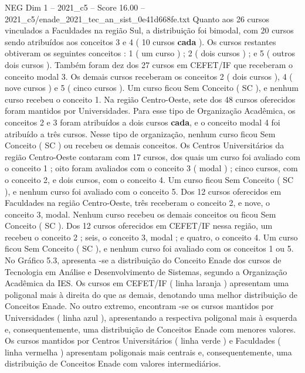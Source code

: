 \begin{textsample}{NEG Dim 1 – 2021\_c5 – Score 16.00 – 2021\_c5/enade\_2021\_tec\_an\_sist\_0e41d668fe.txt}
Quanto aos 26 cursos vinculados a Faculdades na região Sul, a distribuição foi bimodal, com 20 cursos sendo atribuídos aos conceitos 3 e 4 ( 10 cursos \textbf{cada} ).
Os cursos restantes obtiveram os seguintes conceitos : 1 ( um curso ) ; 2 ( dois cursos ) ; e 5 ( outros dois cursos ).
Também foram dez dos 27 cursos em CEFET/IF que receberam o conceito modal 3.
Os demais cursos receberam os conceitos 2 ( dois cursos ), 4 ( nove cursos ) e 5 ( cinco cursos ).
Um curso ficou Sem Conceito ( SC ), e nenhum curso recebeu o conceito 1.
Na região Centro-Oeste, sete dos 48 cursos oferecidos foram mantidos por Universidades.
Para esse tipo de Organização Acadêmica, os conceitos 2 e 3 foram atribuídos a dois cursos \textbf{cada}, e o conceito modal 4 foi atribuído a três cursos.
Nesse tipo de organização, nenhum curso ficou Sem Conceito ( SC ) ou recebeu os demais conceitos.
Os Centros Universitários da região Centro-Oeste contaram com 17 cursos, dos quais um curso foi avaliado com o conceito 1 ; oito foram avaliados com o conceito 3 ( modal ) ; cinco cursos, com o conceito 2, e dois cursos, com o conceito 4.
Um curso ficou Sem Conceito ( SC ), e nenhum curso foi avaliado com o conceito 5.
Dos 12 cursos oferecidos em Faculdades na região Centro-Oeste, três receberam o conceito 2, e nove, o conceito 3, modal.
Nenhum curso recebeu os demais conceitos ou ficou Sem Conceito ( SC ).
Dos 12 cursos oferecidos em CEFET/IF nessa região, um recebeu o conceito 2 ; seis, o conceito 3, modal ; e quatro, o conceito 4.
Um curso ficou Sem Conceito ( SC ), e nenhum curso foi avaliado com os conceitos 1 ou 5.
No Gráfico 5.3, apresenta -se a distribuição do Conceito Enade dos cursos de Tecnologia em Análise e Desenvolvimento de Sistemas, segundo a Organização Acadêmica da IES.
Os cursos em CEFET/IF ( linha laranja ) apresentam uma poligonal mais à direita do que as demais, denotando uma melhor distribuição de Conceitos Enade.
No outro extremo, encontram -se os cursos mantidos por Universidades ( linha azul ), apresentando a respectiva poligonal mais à esquerda e, consequentemente, uma distribuição de Conceitos Enade com menores valores.
Os cursos mantidos por Centros Universitários ( linha verde ) e Faculdades ( linha vermelha ) apresentam poligonais mais centrais e, consequentemente, uma distribuição de Conceitos Enade com valores intermediários.

\end{textsample}
